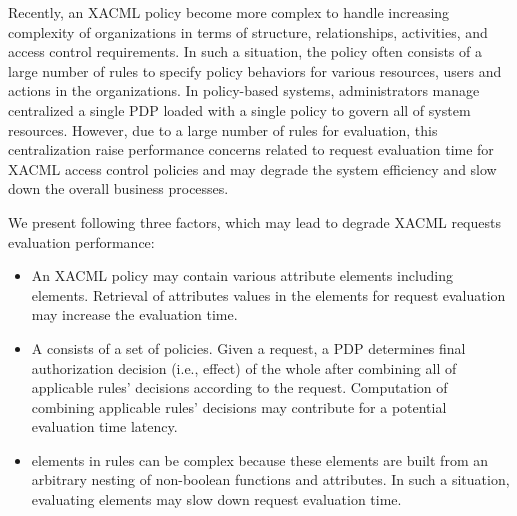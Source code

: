 

Recently, an XACML policy become more complex to handle increasing complexity of organizations in terms of structure, relationships, activities, and access control requirements. In such a situation, the policy often consists of a large number of rules to specify policy behaviors for various resources, users and actions in the organizations.
In policy-based systems, administrators manage centralized a single PDP loaded with a single policy to govern all of system resources. 
However, due to a large number of rules for evaluation, this centralization raise performance concerns related to request evaluation time for XACML access control policies and may 
degrade the system efficiency and slow down the overall business processes. 

We present following three factors, which may lead to degrade XACML requests evaluation performance: 

\begin{itemize}
\item An XACML policy may contain various attribute elements including  elements. Retrieval of
attributes values in the  elements for request evaluation may increase the evaluation time.
\item A  consists of a set of policies. Given a request, a PDP determines final authorization decision (i.e., effect) of the whole  after combining all of applicable rules' decisions according to the request.
Computation of combining applicable rules' decisions may contribute for a potential evaluation time latency.
\item {} elements in rules can be complex because these elements are built from an arbitrary nesting of non-boolean functions and attributes. In such a situation, evaluating  elements may slow down request evaluation time.
\end{itemize}

